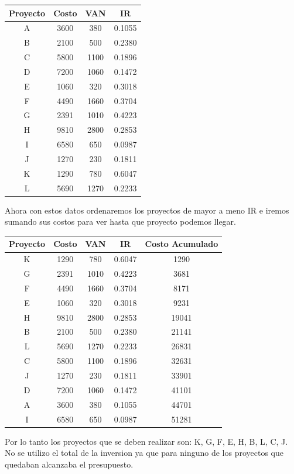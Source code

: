\documentclass{templateNote}
\begin{document}
\begin{center}
    \begin{tabular}{|c|c|c|c|}
        \hline
        Proyecto & Costo & VAN & IR \\
        \hline
        A & 3600 & 380 & 0.1055 \\
        B & 2100 & 500 & 0.2380 \\
        C & 5800 & 1100 & 0.1896 \\
        D & 7200 & 1060 & 0.1472 \\
        E & 1060 & 320 & 0.3018 \\
        F & 4490 & 1660 & 0.3704 \\
        G & 2391 & 1010 & 0.4223 \\
        H & 9810 & 2800 & 0.2853 \\
        I & 6580 & 650 & 0.0987 \\
        J & 1270 & 230 & 0.1811 \\
        K & 1290 & 780 & 0.6047 \\
        L & 5690 & 1270 & 0.2233 \\
        \hline
    \end{tabular}
\end{center}

Ahora con estos datos ordenaremos los proyectos de mayor a meno IR e iremos sumando sus costos para ver hasta que proyecto podemos llegar.

\begin{center}
    \begin{tabular}{|c|c|c|c|c|}
        \hline
        Proyecto & Costo & VAN & IR & Costo Acumulado\\
        \hline
        K & 1290 & 780 & 0.6047 & 1290 \\   
        G & 2391 & 1010 & 0.4223 & 3681 \\
        F & 4490 & 1660 & 0.3704 & 8171 \\
        E & 1060 & 320 & 0.3018 & 9231 \\
        H & 9810 & 2800 & 0.2853 & 19041 \\
        B & 2100 & 500 & 0.2380 & 21141 \\
        L & 5690 & 1270 & 0.2233 & 26831 \\
        C & 5800 & 1100 & 0.1896 & 32631 \\
        J & 1270 & 230 & 0.1811 & 33901 \\
        D & 7200 & 1060 & 0.1472 & 41101 \\
        A & 3600 & 380 & 0.1055 & 44701 \\
        I & 6580 & 650 & 0.0987 & 51281 \\
        \hline
    \end{tabular}
\end{center}

Por lo tanto los proyectos que se deben realizar son: K, G, F, E, H, B, L, C, J. No se utilizo el total de la inversion ya que para ninguno de los proyectos que quedaban alcanzaba el presupuesto.
\end{document}
